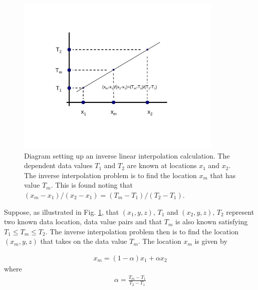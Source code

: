 \documentclass[11pt,twoside]{book}
\begin{document}
\begin{figure}[bph]
\begin{center}
\includegraphics[height=3.0in]{FIGURES/linear_interpolation}
\end{center}
\caption[Diagram setting up an inverse linear interpolation calculation]
{Diagram setting up an inverse linear interpolation calculation.
The dependent data values $T_1$ and $T_2$ are known at locations $x_1$ and $x_2$.
The inverse interpolation problem is to find the location $x_m$ that has value $T_m$.
This is found noting that $(x_m-x_1)/(x_2-x_1)=(T_m-T_1)/(T_2-T_1)$.
 }
\label{figisointerp}%
\end{figure}

Suppose, as illustrated in Fig. \ref{figisointerp}, that $(x_1,y,z)$, $T_1$ and
$(x_2,y,z)$, $T_2$ represent two known data location, data value pairs and
that $T_m$ is also known satisfying $T_1\le T_m \le T_2$.  The inverse
interpolation problem then is to find the location $(x_m,y,z)$ that takes on
the data value $T_m$.  The location $x_m$ is given by

\begin{eqnarray}
x_m=(1-\alpha)x_1+\alpha x_2
\end{eqnarray}
where
\begin{eqnarray}
\alpha=\frac{T_m-T_1}{T_2-T_1}
\end{eqnarray}
\end{document}
